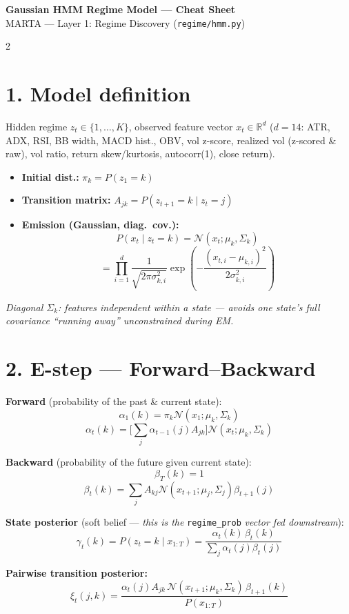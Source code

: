 \documentclass[9pt]{extarticle}
\newcommand{\N}{\mathcal{N}}
\begin{document}
\begin{center}
{\Large\bfseries Gaussian HMM Regime Model --- Cheat Sheet}\\[2pt]
{\small MARTA --- Layer 1: Regime Discovery (\texttt{regime/hmm.py})}
\end{center}
\vspace{2pt}

\begin{multicols}{2}

\section{1. Model definition}
Hidden regime $z_t \in \{1,\dots,K\}$, observed feature vector $x_t \in \mathbb{R}^d$
($d=14$: ATR, ADX, RSI, BB width, MACD hist., OBV, vol z-score, realized vol
(z-scored \& raw), vol ratio, return skew/kurtosis, autocorr(1), close return).

\begin{itemize}
\item \textbf{Initial dist.:} $\pi_k = P(z_1=k)$
\item \textbf{Transition matrix:} $A_{jk} = P(z_{t+1}=k \mid z_t=j)$
\item \textbf{Emission (Gaussian, diag.\ cov.):}
$$P(x_t \mid z_t=k) = \N(x_t;\mu_k,\Sigma_k)$$
$$= \prod_{i=1}^{d} \frac{1}{\sqrt{2\pi\sigma_{k,i}^2}}\exp\!\left(-\frac{(x_{t,i}-\mu_{k,i})^2}{2\sigma_{k,i}^2}\right)$$
\end{itemize}
\textit{Diagonal $\Sigma_k$: features independent within a state --- avoids one
state's full covariance ``running away'' unconstrained during EM.}

\section{2. E-step --- Forward--Backward}
\textbf{Forward} (probability of the past \& current state):
$$\alpha_1(k)=\pi_k\N(x_1;\mu_k,\Sigma_k)$$
$$\alpha_t(k)=\Big[\textstyle\sum_j \alpha_{t-1}(j)A_{jk}\Big]\N(x_t;\mu_k,\Sigma_k)$$

\textbf{Backward} (probability of the future given current state):
$$\beta_T(k)=1$$
$$\beta_t(k)=\sum_j A_{kj}\N(x_{t+1};\mu_j,\Sigma_j)\beta_{t+1}(j)$$

\textbf{State posterior} (soft belief --- \emph{this is the } \texttt{regime\_prob} \emph{ vector fed downstream}):
$$\gamma_t(k)=P(z_t=k\mid x_{1:T})=\frac{\alpha_t(k)\,\beta_t(k)}{\sum_j \alpha_t(j)\beta_t(j)}$$

\textbf{Pairwise transition posterior:}
$$\xi_t(j,k)=\frac{\alpha_t(j)A_{jk}\,\N(x_{t+1};\mu_k,\Sigma_k)\,\beta_{t+1}(k)}{P(x_{1:T})}$$


\end{multicols}
\end{document}
